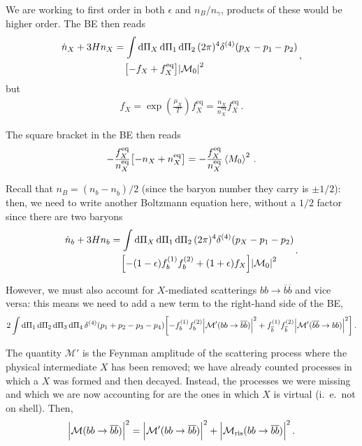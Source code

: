 \documentclass[main.tex]{subfiles}
\begin{document}
We are working to first order in both \(\epsilon \) and \(n_B / n_\gamma \), products of these would be higher order. 
The BE then reads 
%
\begin{align}
\begin{split}
\dot{n}_X + 3 H n_X &= 
\int \dd{\Pi_X } \dd{\Pi_1 } \dd{\Pi _2} (2 \pi )^{4} \delta^{(4)}(p_X - p_1 - p_2)\\
&\phantom{=}\ 
\qty[- f_X + f_X^{\text{eq}}] \abs{\mathcal{M}_0}^2
\end{split}
\,,
\end{align}
%
but 
%
\begin{align}
f_X = \exp( \frac{\mu_X}{T}) f_X^{\text{eq}} = \frac{n_X}{n_X^{\text{eq}}} f_X^{\text{eq}}
\,.
\end{align}

The square bracket in the BE then reads 
%
\begin{align}
-\frac{f_X^{\text{eq}}}{n_X^{\text{eq}}} \qty[- n_X + n_X^{\text{eq}}]
= -\frac{f_X^{\text{eq}}}{n_X^{\text{eq}}}
\expval{M_0}^2
\,.
\end{align}

Recall that \(n_B = (n_b - n_{\overline{b}}) / 2\) (since the baryon number they carry is \(\pm 1/2\)): then, we need to write another Boltzmann equation here, without a \(1/2\) factor since there are two baryons
%
\begin{align}
\begin{split}
\dot{n}_b + 3 H n_b &=
\int \dd{\Pi_X } \dd{\Pi_1 } \dd{\Pi _2} (2 \pi )^{4} \delta^{(4)}(p_X - p_1 - p_2)\\
&\phantom{=}\ 
\qty[- (1 - \epsilon ) f_b^{(1)} f_b^{(2)} +
(1 + \epsilon ) f_X
] \abs{\mathcal{M}_0}^2
\end{split}
\,.
\end{align}

However, we must also account for \(X\)-mediated scatterings \(bb \to \overline{b} \overline{b}\) and vice versa: this means we need to add a new term to the right-hand side of the BE, 
%
\begin{align}
2 \int \dd{\Pi_1 } \dd{\Pi_2 } \dd{\Pi_3 } \dd{\Pi_4 } \delta^{(4)}(p_1 + p_2 - p_3 - p_4)
\qty[-f_b^{(1)} f_b^{(2)} \abs{\mathcal{M}' (bb \to \overline{b} \overline{b})}^2 
+
f_{\overline{b}}^{(1)} f_{\overline{b}}^{(2)} \abs{\mathcal{M}' (\overline{b} \overline{b} \to bb) }^2
]
\,.
\end{align}

The quantity \(\mathcal{M}'\) is the Feynman amplitude of the scattering process where the physical intermediate \(X\) has been removed; we have already counted processes in which a \(X\) was formed and then decayed.
Instead, the processes we were missing and which we are now accounting for are the ones in which \(X\) is virtual (i.\ e.\ not on shell).
Then, 
%
\begin{align}
\abs{\mathcal{M} (bb \to \overline{b} \overline{b})}^2= 
\abs{\mathcal{M}' (bb \to \overline{b} \overline{b})}^2
+ \abs{\mathcal{M} _{\text{ris}} ( bb  \to \overline{b} \overline{b})}^2
\,.
\end{align}
\end{document}
